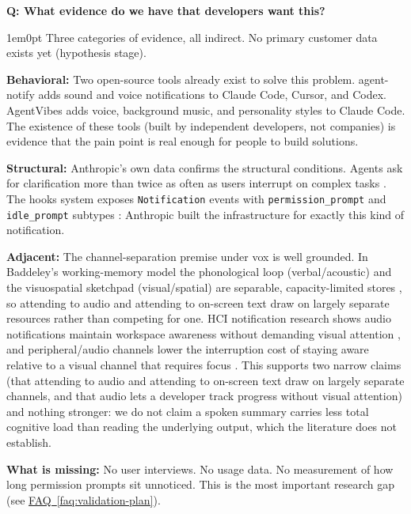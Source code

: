 \documentclass[11pt,letterpaper]{article}
\newcounter{faqnum}
\newenvironment{faqpair}[1]{%
  \needspace{4\baselineskip}%
  \vspace{0.5em}%
  \refstepcounter{faqnum}%
  \noindent\textbf{\color{SectionBlue}Q\thefaqnum: #1}\par\nopagebreak[4]%
  \vspace{0.2em}%
  \begin{adjustwidth}{1em}{0pt}%
  \setlength{\parindent}{0pt}%
}{%
  \end{adjustwidth}%
  \vspace{0.5em}%
}
\newcommand{\faqref}[1]{\hyperref[#1]{FAQ~\ref*{#1}}}
\begin{document}
\begin{faqpair}{What evidence do we have that developers want this?}\label{faq:evidence}
  Three categories of evidence, all indirect. No primary customer data exists
  yet (hypothesis stage).

  \textbf{Behavioral:} Two open-source tools already exist to solve this
  problem. agent-notify \cite{agentnotify2025} adds sound and voice
  notifications to Claude Code, Cursor, and Codex. AgentVibes
  \cite{agentvibes2025} adds voice, background music, and personality styles
  to Claude Code. The existence of these tools (built by independent
  developers, not companies) is evidence that the pain point is real enough
  for people to build solutions.

  \textbf{Structural:} Anthropic's own data confirms the structural
  conditions. Agents ask for clarification more than twice as often as users
  interrupt on complex tasks \cite{anthropic2026agentautonomy}. The hooks
  system exposes \texttt{Notification} events with
  \texttt{permission\_prompt} and \texttt{idle\_prompt} subtypes
  \cite{claudecodehooks2026}: Anthropic built the infrastructure for
  exactly this kind of notification.

  \textbf{Adjacent:} The channel-separation premise under vox is
  well grounded. In Baddeley's working-memory model the phonological loop
  (verbal/acoustic) and the visuospatial sketchpad (visual/spatial) are
  separable, capacity-limited stores
  \cite{baddeleyhitch1974workingmemory,baddeley2000episodicbuffer}, so
  attending to audio and attending to on-screen text draw on largely separate
  resources rather than competing for one. HCI notification research shows
  audio notifications maintain workspace awareness without demanding visual
  attention \cite{springer2016audiovisual}, and peripheral/audio channels
  lower the interruption cost of staying aware relative to a visual channel
  that requires focus \cite{mccrickardchewar2003attuning}. This supports two
  narrow claims (that attending to audio and attending to on-screen text
  draw on largely separate channels, and that audio lets a developer track
  progress without visual attention) and nothing stronger: we do not claim a spoken summary carries
  less total cognitive load than reading the underlying output, which the
  literature does not establish.

  \textbf{What is missing:} No user interviews. No usage data. No measurement
  of how long permission prompts sit unnoticed. This is the most important
  research gap
  (see \faqref{faq:validation-plan}).
\end{faqpair}
\end{document}
